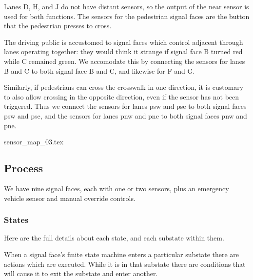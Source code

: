 \documentclass[letterpaper,twoside]{article}
\begin{document}
Lanes D, H, and J do not have distant sensors, so the output
of the near sensor is used for both functions.  The sensors
for the pedestrian signal faces are the button that the pedestrian presses
to cross.

The driving public is accustomed to signal faces which control
adjacent through lanes operating together: they would think it strange
if signal face B turned red while C remained green.  We accomodate this
by connecting the sensors for lanes B and C to both signal face B
and C, and likewise for F and G.

Similarly, if pedestrians can cross the crosswalk in one direction,
it is customary to also allow crossing in the opposite direction,
even if the sensor has not been triggered.  Thus we connect the sensors
for lanes psw and pse to both signal faces psw and pse, and the sensors
for lanes pnw and pne to both signal faces pnw and pne.

 {sensor_map_03.tex}

\subsection{Process}

We have nine signal faces, each with one or two sensors, plus an emergency
vehicle sensor and manual override controls.

\subsubsection{States}

Here are the full details about each state, and each substate within them.

When a signal face's finite state machine enters a particular substate
there are actions which are executed.
While it is in that substate there are conditions
that will cause it to exit the substate and enter another.
\end{document}
